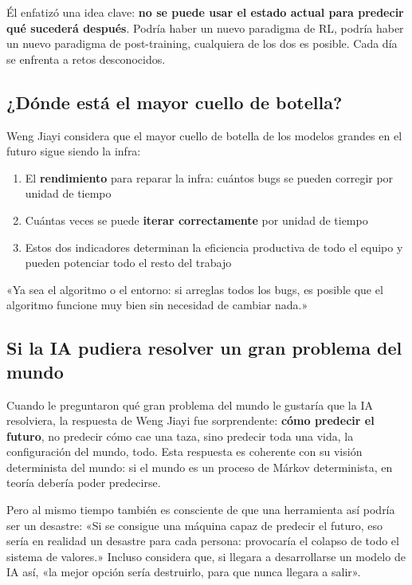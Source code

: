 \documentclass[a4paper]{article}
\begin{document}
Él enfatizó una idea clave: \textbf{no se puede usar el estado actual para predecir qué sucederá después}. Podría haber un nuevo paradigma de RL, podría haber un nuevo paradigma de post-training, cualquiera de los dos es posible. Cada día se enfrenta a retos desconocidos.

\subsection{¿Dónde está el mayor cuello de botella?}

Weng Jiayi considera que el mayor cuello de botella de los modelos grandes en el futuro sigue siendo la infra:

\begin{enumerate}
    \item El \textbf{rendimiento} para reparar la infra: cuántos bugs se pueden corregir por unidad de tiempo
    \item Cuántas veces se puede \textbf{iterar correctamente} por unidad de tiempo
    \item Estos dos indicadores determinan la eficiencia productiva de todo el equipo y pueden potenciar todo el resto del trabajo
\end{enumerate}

«Ya sea el algoritmo o el entorno: si arreglas todos los bugs, es posible que el algoritmo funcione muy bien sin necesidad de cambiar nada.»

\subsection{Si la IA pudiera resolver un gran problema del mundo}

Cuando le preguntaron qué gran problema del mundo le gustaría que la IA resolviera, la respuesta de Weng Jiayi fue sorprendente: \textbf{cómo predecir el futuro}, no predecir cómo cae una taza, sino predecir toda una vida, la configuración del mundo, todo. Esta respuesta es coherente con su visión determinista del mundo: si el mundo es un proceso de Márkov determinista, en teoría debería poder predecirse.

Pero al mismo tiempo también es consciente de que una herramienta así podría ser un desastre: «Si se consigue una máquina capaz de predecir el futuro, eso sería en realidad un desastre para cada persona: provocaría el colapso de todo el sistema de valores.» Incluso considera que, si llegara a desarrollarse un modelo de IA así, «la mejor opción sería destruirlo, para que nunca llegara a salir».
\end{document}
